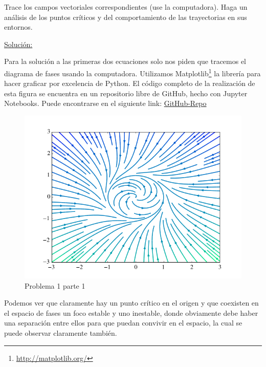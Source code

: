 \documentclass[a4paper,10pt]{article}
\numberwithin{equation}{section}
\begin{document}
Trace los campos vectoriales correspondientes (use la computadora). Haga un análisis de los 
puntos críticos y del comportamiento de las trayectorias en sus entornos.

\vspace{.3cm}

\underline{Solución:}

Para la solución a las primeras dos ecuaciones solo nos piden que tracemos el diagrama
de fases usando la computadora. Utilizamos Matplotlib\footnote{\href{http://matplotlib.org/}{http://matplotlib.org/}} la librería para hacer graficar 
por excelencia de Python. El código completo de la realización de esta figura se encuentra
en un repositorio libre de GitHub, hecho con Jupyter Notebooks. Puede encontrarse en el
siguiente link: \href{https://github.com/FavioVazquez/MecanicaClasica-PCF/blob/master/Tarea2/Tarea2\%20-\%20Problema1.ipynb}{GitHub-Repo}

\begin{figure}[ht]
 \centering
\includegraphics[scale=0.5]{problema1fig1}
\caption{Problema 1 parte 1}
\label{fig:problema1fig1}
\end{figure}


\vspace{.3cm}

Podemos ver que claramente hay un punto crítico en el origen y que coexisten 
en el espacio de fases un foco estable y uno inestable, donde obviamente debe haber
una separación entre ellos para que puedan convivir en el espacio, la cual se puede
observar claramente también.

\vspace{.3cm}
\end{document}
